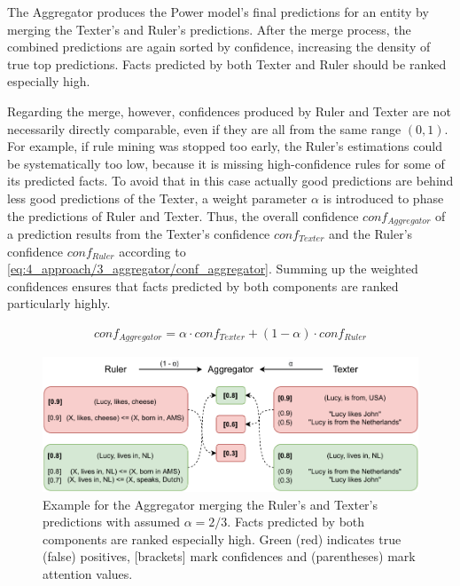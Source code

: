 The Aggregator produces the Power model's final predictions for an entity by merging the Texter's and Ruler's predictions. After the merge process, the combined predictions are again sorted by confidence, increasing the density of true top predictions. Facts predicted by both Texter and Ruler should be ranked especially high.

Regarding the merge, however, confidences produced by Ruler and Texter are not necessarily directly comparable, even if they are all from the same range $(0, 1)$. For example, if rule mining was stopped too early, the Ruler's estimations could be systematically too low, because it is missing high-confidence rules for some of its predicted facts. To avoid that in this case actually good predictions are behind less good predictions of the Texter, a weight parameter $\alpha$ is introduced to phase the predictions of Ruler and Texter. Thus, the overall confidence $conf_{Aggregator}$ of a prediction results from the Texter's confidence $conf_{Texter}$ and the Ruler's confidence $conf_{Ruler}$ according to \autoref{eq:4_approach/3_aggregator/conf_aggregator}. Summing up the weighted confidences ensures that facts predicted by both components are ranked particularly highly.

\begin{align}
    conf_{Aggregator} = \alpha \cdot conf_{Texter} + (1 - \alpha) \cdot conf_{Ruler}
    \label{eq:4_approach/3_aggregator/conf_aggregator}
\end{align}

\begin{figure}[t]
    \includegraphics[width=\textwidth]{4_approach/3_aggregator/lucy}
    \caption{Example for the Aggregator merging the Ruler's and Texter's predictions with assumed $\alpha = 2/3$. Facts predicted by both components are ranked especially high. Green (red) indicates true (false) positives, [brackets] mark confidences and (parentheses) mark attention values.}
    \label{fig:4_approach/3_aggregator/lucy}
\end{figure}

